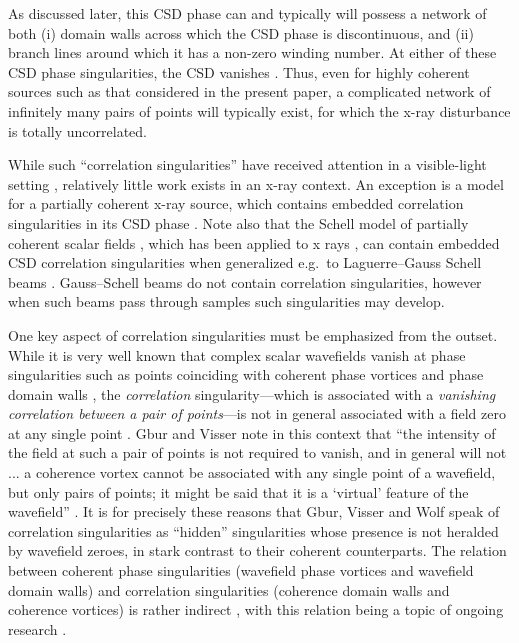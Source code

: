 \documentclass[%
 reprint,
 amsmath,amssymb,
 aps,
]{revtex4-1}
\begin{document}
As discussed later, this CSD phase can and typically will possess a network of both (i) domain walls across which the CSD phase is discontinuous, and (ii) branch lines around which it has a non-zero winding number.  At either of these CSD phase singularities, the CSD vanishes \cite{TopologicalReactionsCohVortices,Marasinghe2010}.  Thus, even for highly coherent sources such as that considered in the present paper, a complicated network of infinitely many pairs of points will typically exist, for which the x-ray disturbance is totally uncorrelated. 

While such ``correlation singularities'' have received attention in a visible-light setting \cite{Schouten2003,GburVisser2003,Bogatyryova2003,FischerVisser2004,Palacios2004,GburVisser2006,Wang2006,TopologicalReactionsCohVortices,GburVisser2010,Marasinghe2010,Marasinghe2011}, relatively little work exists in an x-ray context.  An exception is a model for a partially coherent x-ray source, which contains embedded correlation singularities in its CSD phase  \cite{PellicciaPaganin2012}. Note also that the Schell model of partially coherent scalar fields \cite{mandel_wolf}, which has been applied to x rays \cite{Coisson1997,Vartanyants2010}, can contain embedded CSD correlation singularities when generalized e.g.~to Laguerre--Gauss Schell beams \cite{Palacios2004,Rodrigo2015}.  Gauss--Schell beams do not contain correlation singularities, however when such beams pass through samples such singularities may develop. 

One key aspect of correlation singularities must be emphasized from the outset.  While it is very well known that complex scalar wavefields vanish at phase singularities such as points coinciding with coherent phase vortices \cite{Dirac1931} and phase domain walls \cite{paganin_book}, the {\em correlation} singularity---which is associated with a {\em vanishing correlation between a  pair of points}---is not in general associated with a field zero at any single point \cite{GburVisser2003, GburVisserWolf2004,GburVisser2006,TopologicalReactionsCohVortices,GburVisser2010}.  Gbur and Visser note in this context that ``the intensity of the field at such a pair of points is not required to vanish, and in general will not ... a coherence vortex cannot be associated with any single point of a wavefield, but only pairs of points; it might be said that it is a `virtual' feature of the wavefield'' \cite{GburVisser2003}.   It is for precisely these reasons that Gbur, Visser and Wolf speak of correlation singularities as ``hidden'' singularities \cite{GburVisserWolf2004} whose presence is not heralded by wavefield zeroes, in stark contrast to their coherent counterparts.  The relation between coherent phase singularities (wavefield phase vortices and wavefield domain walls) and correlation singularities (coherence domain walls and coherence vortices) is rather indirect \cite{GburVisser2006,TopologicalReactionsCohVortices,GburVisser2010}, with this relation being a topic of ongoing research \cite{PangGburVisser2015}.
\end{document}
